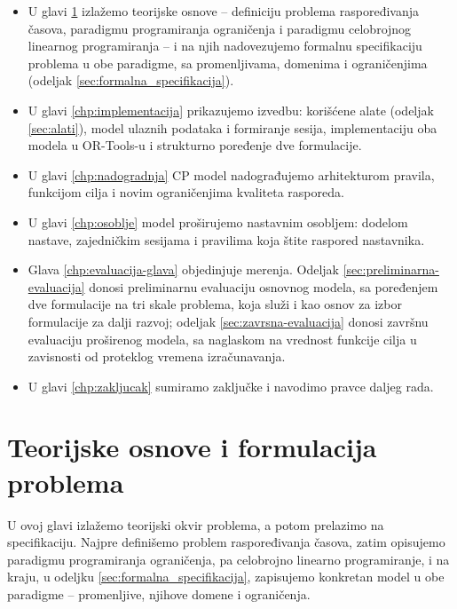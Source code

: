 \documentclass[12pt,oneside]{memoir}
\begin{document}
\begin{itemize}
\item U glavi \ref{chp:teorija} izlažemo teorijske osnove -- definiciju
  problema raspoređivanja časova, paradigmu programiranja ograničenja i
  paradigmu celobrojnog linearnog programiranja -- i na njih nadovezujemo
  formalnu specifikaciju problema u obe paradigme, sa promenljivama,
  domenima i ograničenjima (odeljak \ref{sec:formalna_specifikacija}).

\item U glavi \ref{chp:implementacija} prikazujemo izvedbu: korišćene
  alate (odeljak \ref{sec:alati}), model ulaznih podataka i formiranje
  sesija, implementaciju oba modela u OR-Tools-u i strukturno poređenje
  dve formulacije.

\item U glavi \ref{chp:nadogradnja} CP model nadograđujemo arhitekturom
  pravila, funkcijom cilja i novim ograničenjima kvaliteta rasporeda.

\item U glavi \ref{chp:osoblje} model proširujemo nastavnim osobljem:
  dodelom nastave, zajedničkim sesijama i pravilima koja štite
  raspored nastavnika.

\item Glava \ref{chp:evaluacija-glava} objedinjuje merenja. Odeljak
  \ref{sec:preliminarna-evaluacija} donosi preliminarnu evaluaciju
  osnovnog modela, sa poređenjem dve formulacije na tri skale problema,
  koja služi i kao osnov za izbor formulacije za dalji razvoj; odeljak
  \ref{sec:zavrsna-evaluacija} donosi završnu evaluaciju proširenog
  modela, sa naglaskom na vrednost funkcije cilja u zavisnosti od
  proteklog vremena izračunavanja.

\item U glavi \ref{chp:zakljucak} sumiramo zaključke i navodimo pravce
  daljeg rada.
\end{itemize}


\chapter{Teorijske osnove i formulacija problema}
\label{chp:teorija}

U ovoj glavi izlažemo teorijski okvir problema, a potom prelazimo na
specifikaciju. Najpre definišemo problem raspoređivanja
časova, zatim opisujemo paradigmu programiranja ograničenja, pa
celobrojno linearno programiranje, i na kraju, u odeljku
\ref{sec:formalna_specifikacija}, zapisujemo konkretan model u obe
paradigme -- promenljive, njihove domene i ograničenja.
\end{document}
